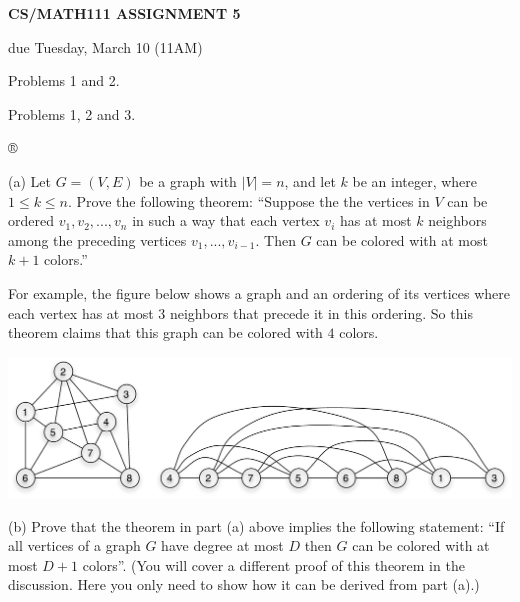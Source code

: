 \documentclass{article}
\begin{document}
\centerline{\large \bf CS/MATH111 ASSIGNMENT 5}
\centerline{due Tuesday, March 10 (11AM)}

\vskip 0.15in
 Problems 1 and 2.

 Problems 1, 2 and 3.

\vskip 0.15in
®

\begin{problem}
(a) Let $G = (V,E)$ be a graph with $|V| = n$, and let $k$ be an integer, where $1\le k\le n$.
Prove the following theorem:
``Suppose the the vertices in $V$ can be ordered $v_1,v_2,...,v_n$ in such a way
that each vertex $v_i$ has at most $k$ neighbors among the preceding
vertices $v_1,...,v_{i-1}$. Then $G$ can be colored with at most $k+1$ colors.''

For example, the figure below shows a graph and an ordering of its
vertices where each vertex has at most $3$ neighbors that precede it in this
ordering. So this theorem claims that this graph can be colored with $4$ colors.

	\begin{center}
	\includegraphics[width = 6in]{ordering_hw5.pdf}
	\end{center}

\noindent
(b)
Prove that the theorem in part (a) above implies the following
statement: ``If all vertices of a graph $G$ have degree at most $D$
then $G$ can be colored with at most $D+1$ colors''.
(You will cover a different proof of this theorem in the discussion. Here you
only need to show how it can be derived from part (a).)

\end{problem}
\end{document}
